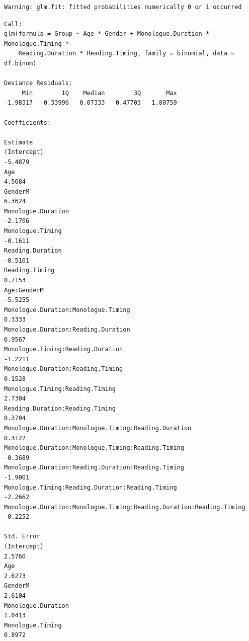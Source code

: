 \documentclass[
  english,
  doc,floatsintext]{apa6}
\begin{document}
\begin{verbatim}
Warning: glm.fit: fitted probabilities numerically 0 or 1 occurred
\end{verbatim}

\begin{verbatim}
Call:
glm(formula = Group ~ Age * Gender + Monologue.Duration * Monologue.Timing * 
    Reading.Duration * Reading.Timing, family = binomial, data = df.binom)

Deviance Residuals: 
     Min        1Q    Median        3Q       Max  
-1.98317  -0.33996   0.07333   0.47703   1.80759  

Coefficients:
                                                                    Estimate
(Intercept)                                                          -5.4879
Age                                                                   4.5684
GenderM                                                               6.3624
Monologue.Duration                                                   -2.1706
Monologue.Timing                                                     -0.1611
Reading.Duration                                                     -0.5101
Reading.Timing                                                        0.7153
Age:GenderM                                                          -5.5255
Monologue.Duration:Monologue.Timing                                   0.3333
Monologue.Duration:Reading.Duration                                   0.9567
Monologue.Timing:Reading.Duration                                    -1.2211
Monologue.Duration:Reading.Timing                                     0.1528
Monologue.Timing:Reading.Timing                                       2.7304
Reading.Duration:Reading.Timing                                       0.3704
Monologue.Duration:Monologue.Timing:Reading.Duration                  0.3122
Monologue.Duration:Monologue.Timing:Reading.Timing                   -0.3689
Monologue.Duration:Reading.Duration:Reading.Timing                   -1.9001
Monologue.Timing:Reading.Duration:Reading.Timing                     -2.2662
Monologue.Duration:Monologue.Timing:Reading.Duration:Reading.Timing  -0.2252
                                                                    Std. Error
(Intercept)                                                             2.5760
Age                                                                     2.6273
GenderM                                                                 2.6104
Monologue.Duration                                                      1.0413
Monologue.Timing                                                        0.8972

\end{verbatim}
\end{document}
